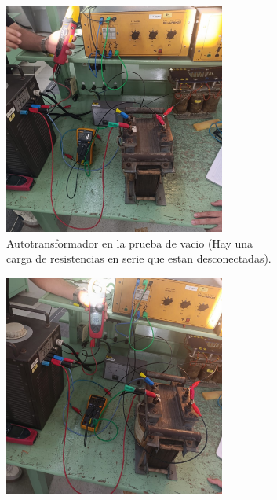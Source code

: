 \begin{figure}[ht!] %
    \centering %
    \begin{subfigure}{0.5\textwidth}
            \centering
            \includegraphics[width=0.8\textwidth]{fot/prac4_autoenvacio.jpeg} %
            \caption{Autotransformador en la prueba de vacio (Hay una carga de resistencias en serie que estan desconectadas).}
            \label{fig:prac4_autoenvacio}
    \end{subfigure}
    \hfill %
    \begin{subfigure}{0.5\textwidth}
        \centering
        \includegraphics[width=0.8\textwidth]{fot/prac4_autoR_.jpeg} %

\end{subfigure}
\end{figure}
